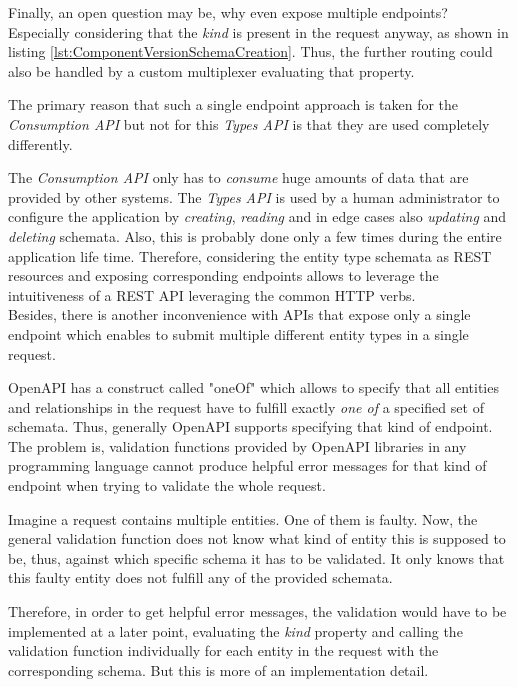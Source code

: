 Finally, an open question may be, why even expose multiple endpoints? Especially considering that the \emph{kind} is present in the request anyway, as shown in listing \ref{lst:ComponentVersionSchemaCreation}. Thus, the further routing could also be handled by a custom multiplexer evaluating that property.\par
The primary reason that such a single endpoint approach is taken for the \emph{Consumption API} but not for this \emph{Types API} is that they are used completely differently.\par
The \emph{Consumption API} only has to \emph{consume} huge amounts of data that are provided by other systems. The \emph{Types API} is used by a human administrator to configure the application by \emph{creating}, \emph{reading} and in edge cases also \emph{updating} and \emph{deleting} schemata. Also, this is probably done only a few times during the entire application life time. Therefore, considering the entity type schemata as REST resources and exposing corresponding endpoints allows to leverage the intuitiveness of a REST API leveraging the common HTTP verbs.\\

Besides, there is another inconvenience with APIs that expose only a single endpoint which enables to submit multiple different entity types in a single request.\par 
OpenAPI has a construct called "oneOf" which allows to specify that all entities and relationships in the request have to fulfill exactly \emph{one of} a specified set of schemata. Thus, generally OpenAPI supports specifying that kind of endpoint. The problem is, validation functions provided by OpenAPI libraries in any programming language cannot produce helpful error messages for that kind of endpoint when trying to validate the whole request.\par 
Imagine a request contains multiple entities. One of them is faulty. Now, the general validation function does not know what kind of entity this is supposed to be, thus, against which specific schema it has to be validated. It only knows that this faulty entity does not fulfill any of the provided schemata.\par
Therefore, in order to get helpful error messages, the validation would have to be implemented at a later point, evaluating the \emph{kind} property and calling the validation function individually for each entity in the request with the corresponding schema. But this is more of an implementation detail.

